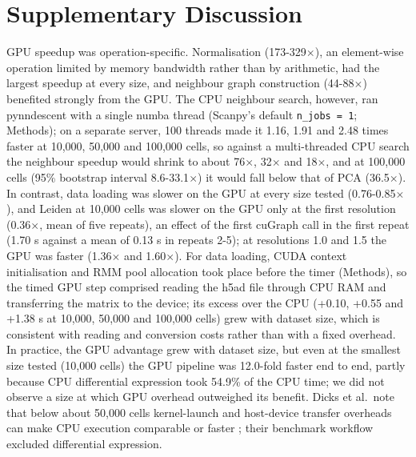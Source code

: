 \documentclass[runningheads]{llncs}
\begin{document}
\hypertarget{supplementary-discussion}{%
\section{Supplementary Discussion}\label{supplementary-discussion}}

GPU speedup was operation-specific. Normalisation (173-329$\times$), an element-wise operation limited by memory bandwidth rather than by arithmetic, had the largest speedup at every size, and neighbour graph construction (44-88$\times$) benefited strongly from the GPU. The CPU neighbour search, however, ran pynndescent with a single numba thread (Scanpy's default \texttt{n\_\allowbreak{}jobs\ =\ 1}; Methods); on a separate server, 100 threads made it 1.16, 1.91 and 2.48 times faster at 10,000, 50,000 and 100,000 cells, so against a multi-threaded CPU search the neighbour speedup would shrink to about 76$\times$, 32$\times$ and 18$\times$, and at 100,000 cells (95\% bootstrap interval 8.6-33.1$\times$) it would fall below that of PCA (36.5$\times$). In contrast, data loading was slower on the GPU at every size tested (0.76-0.85$\times$), and Leiden at 10,000 cells was slower on the GPU only at the first resolution (0.36$\times$, mean of five repeats), an effect of the first cuGraph call in the first repeat (1.70 s against a mean of 0.13 s in repeats 2-5); at resolutions 1.0 and 1.5 the GPU was faster (1.36$\times$ and 1.60$\times$). For data loading, CUDA context initialisation and RMM pool allocation took place before the timer (Methods), so the timed GPU step comprised reading the h5ad file through CPU RAM and transferring the matrix to the device; its excess over the CPU (+0.10, +0.55 and +1.38 s at 10,000, 50,000 and 100,000 cells) grew with dataset size, which is consistent with reading and conversion costs rather than with a fixed overhead. In practice, the GPU advantage grew with dataset size, but even at the smallest size tested (10,000 cells) the GPU pipeline was 12.0-fold faster end to end, partly because CPU differential expression took 54.9\% of the CPU time; we did not observe a size at which GPU overhead outweighed its benefit. Dicks et al.~note that below about 50,000 cells kernel-launch and host-device transfer overheads can make CPU execution comparable or faster \cite{Dicks2026}; their benchmark workflow excluded differential expression.
\end{document}
